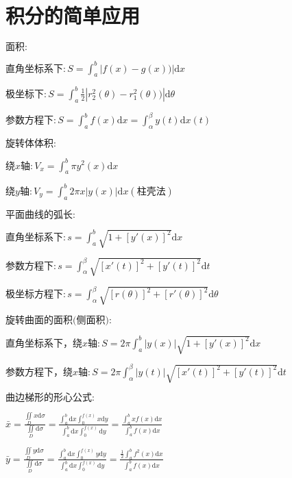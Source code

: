 \section{积分的简单应用}

\begin{spacing}{\hangju}
    \noindent $\mbox{面积}\colon$

    $\mbox{直角坐标系下}\colon S = \int_{a}^{b}{|f(x) - g(x))|\mathrm{d}x}$

    $\mbox{极坐标下}\colon S = \int_{a}^{b}{\frac{1}{2}|r_{2}^{2}(\theta) - r_{1}^{2}(\theta))|\mathrm{d}\theta}$

    $\mbox{参数方程下}\colon S = \int_{a}^{b}{f(x)\mathrm{d}x} =\int_{\alpha}^{\beta}{y(t)\mathrm{d}x(t)}$

    \noindent $\mbox{旋转体体积}\colon$

    $\mbox{绕}x\mbox{轴}\colon V_{x} = \int_{a}^{b}{\pi y^2(x)\mathrm{d}x}$

    $\mbox{绕}y\mbox{轴}\colon V_{y} = \int_{a}^{b}{2\pi x|y(x)|\mathrm{d}x}(\mbox{柱壳法})$

    \noindent $\mbox{平面曲线的弧长}\colon$

    $\mbox{直角坐标系下}\colon s = \int_{a}^{b}{\sqrt{1 + [y'(x)]^2}\mathrm{d}x}$

    $\mbox{参数方程下}\colon s = \int_{\alpha}^{\beta}{\sqrt{[x'(t)]^2 + [y'(t)]^2}\mathrm{d}t}$

    $\mbox{极坐标方程下}\colon s = \int_{\alpha}^{\beta}{\sqrt{[r(\theta)]^2 + [r'(\theta)]^2}\mathrm{d}\theta}$

    \noindent $\mbox{旋转曲面的面积(侧面积)}\colon$

    $\mbox{直角坐标系下，绕}x\mbox{轴}\colon S = 2\pi\int_{a}^{b}{|y(x)|\sqrt{1 + [y'(x)]^2}\mathrm{d}x}$

    $\mbox{参数方程下，绕}x\mbox{轴}\colon S = 2\pi\int_{\alpha}^{\beta}{|y(t)|\sqrt{[x'(t)]^2 + [y'(t)]^2}\mathrm{d}t}$

    \noindent $\mbox{曲边梯形的形心公式}\colon$

    $\bar{x} = \frac{\iint\limits_D{x\mathrm{d}\sigma}}{\iint\limits_D{\mathrm{d}\sigma}} = \frac{\int_{a}^{b}{\mathrm{d}x}\int_{0}^{f(x)}{x\mathrm{d}y}}{\int_{a}^{b}{\mathrm{d}x}\int_{0}^{f(x)}{\mathrm{d}y}} = \frac{\int_{a}^{b}{xf(x)\mathrm{d}x}}{\int_{a}^{b}{f(x)\mathrm{d}x}}$

    $\bar{y} = \frac{\iint\limits_D{y\mathrm{d}\sigma}}{\iint\limits_D{\mathrm{d}\sigma}} = \frac{\int_{a}^{b}{\mathrm{d}x}\int_{0}^{f(x)}{y\mathrm{d}y}}{\int_{a}^{b}{\mathrm{d}x}\int_{0}^{f(x)}{\mathrm{d}y}} = \frac{\frac{1}{2}\int_{a}^{b}{f^{2}(x)\mathrm{d}x}}{\int_{a}^{b}{f(x)\mathrm{d}x}}$


\end{spacing}
